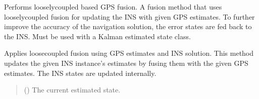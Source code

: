 \documentclass[letterpaper,10pt,english]{sphinxmanual}
\begin{document}

\begin{fulllineitems}
\label{\detokenize{modules/gps/fusion:qnav.gps.fusion.GpsLooseFusion}}
\pysigstartsignatures
{}
\pysigstopsignatures
\sphinxAtStartPar
Performs loosely\sphinxhyphen{}coupled based GPS fusion.
A fusion method that uses loosely\sphinxhyphen{}coupled fusion for updating the INS
with given GPS estimates. To further improve the accuracy of the
navigation solution, the error states are fed back to the INS.
Must be used with a Kalman estimated state class.

\begin{fulllineitems}
\label{\detokenize{modules/gps/fusion:qnav.gps.fusion.GpsLooseFusion.perform_fusion}}
\pysigstartsignatures
{}
\pysigstopsignatures
\sphinxAtStartPar
Applies loose\sphinxhyphen{}coupled fusion using GPS estimates and INS solution.
This method updates the given INS instance’s estimates by fusing them
with the given GPS estimates. The INS states are updated internally.
\begin{quote}\begin{description}
\sphinxAtStartPar
{} ({\hyperref[\detokenize{modules/estimation/state:qnav.estimation.state.KalmanEstimatedState}]{}}) \textendash{} The current estimated state.

\end{description}\end{quote}

\end{fulllineitems}


\end{fulllineitems}
\end{document}
